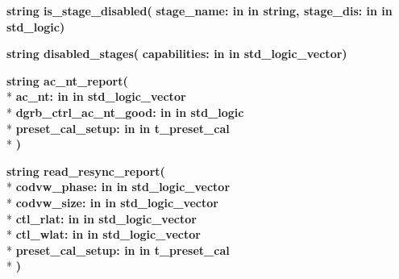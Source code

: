 \begin{DoxyCompactItemize}
{\bfseries {\bfseries \textcolor{comment}{string}\textcolor{vhdlchar}{ }}} {\bf is\+\_\+stage\+\_\+disabled}{\bfseries  ( }{\bfseries \textcolor{vhdlchar}{stage\+\_\+name\+: }\textcolor{stringliteral}{in }\textcolor{vhdlchar}{in string}}{\bfseries  , \textcolor{vhdlchar}{stage\+\_\+dis\+: }\textcolor{stringliteral}{in }\textcolor{vhdlchar}{in std\+\_\+logic}}{\bfseries  )} 
\item 
{\bfseries {\bfseries \textcolor{comment}{string}\textcolor{vhdlchar}{ }}} {\bf disabled\+\_\+stages}{\bfseries  ( }{\bfseries \textcolor{vhdlchar}{capabilities\+: }\textcolor{stringliteral}{in }\textcolor{vhdlchar}{in std\+\_\+logic\+\_\+vector}}{\bfseries  )} 
\item 
{\bfseries {\bfseries \textcolor{comment}{string}\textcolor{vhdlchar}{ }}} {\bf ac\+\_\+nt\+\_\+report}{\bfseries  ( }\\*
{\bfseries \textcolor{vhdlchar}{ac\+\_\+nt\+: }\textcolor{stringliteral}{in }\textcolor{vhdlchar}{in std\+\_\+logic\+\_\+vector}}\\*
{\bfseries \textcolor{vhdlchar}{dgrb\+\_\+ctrl\+\_\+ac\+\_\+nt\+\_\+good\+: }\textcolor{stringliteral}{in }\textcolor{vhdlchar}{in std\+\_\+logic}}\\*
{\bfseries \textcolor{vhdlchar}{preset\+\_\+cal\+\_\+setup\+: }\textcolor{stringliteral}{in }\textcolor{vhdlchar}{in t\+\_\+preset\+\_\+cal}}\\*
{\bfseries  )} 
\item 
{\bfseries {\bfseries \textcolor{comment}{string}\textcolor{vhdlchar}{ }}} {\bf read\+\_\+resync\+\_\+report}{\bfseries  ( }\\*
{\bfseries \textcolor{vhdlchar}{codvw\+\_\+phase\+: }\textcolor{stringliteral}{in }\textcolor{vhdlchar}{in std\+\_\+logic\+\_\+vector}}\\*
{\bfseries \textcolor{vhdlchar}{codvw\+\_\+size\+: }\textcolor{stringliteral}{in }\textcolor{vhdlchar}{in std\+\_\+logic\+\_\+vector}}\\*
{\bfseries \textcolor{vhdlchar}{ctl\+\_\+rlat\+: }\textcolor{stringliteral}{in }\textcolor{vhdlchar}{in std\+\_\+logic\+\_\+vector}}\\*
{\bfseries \textcolor{vhdlchar}{ctl\+\_\+wlat\+: }\textcolor{stringliteral}{in }\textcolor{vhdlchar}{in std\+\_\+logic\+\_\+vector}}\\*
{\bfseries \textcolor{vhdlchar}{preset\+\_\+cal\+\_\+setup\+: }\textcolor{stringliteral}{in }\textcolor{vhdlchar}{in t\+\_\+preset\+\_\+cal}}\\*
{\bfseries  )} 
\item 

\end{DoxyCompactItemize}
